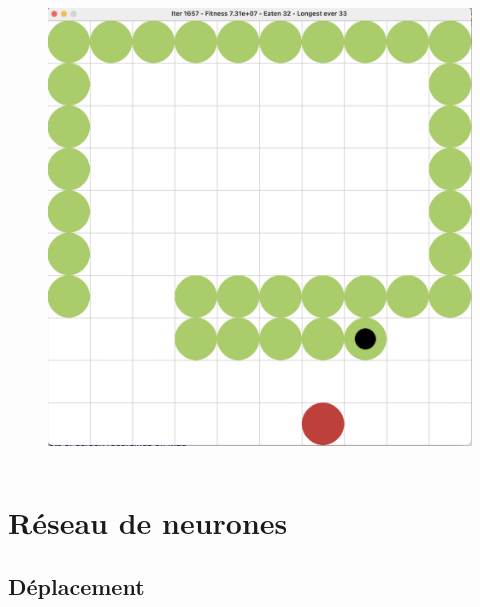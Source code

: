 \documentclass[10pt]{beamer}
\begin{document}
\begin{frame}
\begin{columns}[T]
\begin{column}{0.26\textwidth}
\begin{figure}
\vspace{-0.4cm}
\includegraphics[width=1\textwidth]{snake_game.png}
\end{figure}
\end{column}
\end{columns}
\end{frame}

\section{Réseau de neurones}

\subsection{Déplacement}
\end{document}
